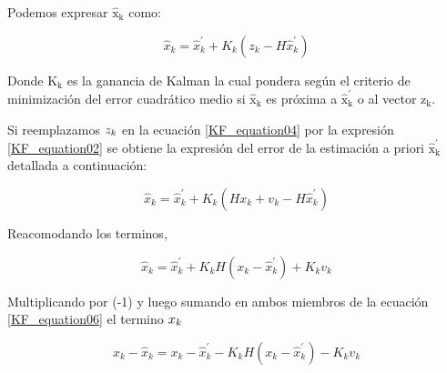 \documentclass[10pt,a4paper]{article}
\begin{document}
    \noindent Podemos expresar $\mathrm{\hat{x}_k}$ como: 
	
	\begin{figure}[h!]
		\begin{center}
			\begin{equation}
				\hat{x}_k = \hat{x}^\prime_k + K_k (z_k - H\hat{x}^\prime_k)
				\label{KF_equation04}
			\end{equation}	
		\end{center}
	\end{figure}
	
    \noindent Donde $\mathrm{K_k}$ es la ganancia de Kalman la cual pondera 
    según el criterio de minimización del error cuadrático medio si
    $\mathrm{\hat{x}_k}$ es próxima a $\mathrm{\hat{x}^\prime_k}$ o al vector 
    $\mathrm{z_k}$.
	
    \noindent Si reemplazamos $\noindent{z_k}$ en la ecuación 
    \ref{KF_equation04} por la expresión \ref{KF_equation02} se obtiene la 
    expresión del error de la estimación a priori $\mathrm{\hat{x}^\prime_k}$ 
    detallada a continuación:
	
	\begin{figure}[h!]
		\begin{center}
			\begin{equation}
				\hat{x}_k = \hat{x}^\prime_k + K_k (Hx_{k} + v_{k} - H\hat{x}^\prime_k)
				\label{KF_equation05}
			\end{equation}	
		\end{center}
	\end{figure}

    \clearpage
	
	\noindent Reacomodando los terminos, 
	
	\begin{figure}[h!]
		\begin{center}
			\begin{equation}
				\hat{x}_k = \hat{x}^\prime_k + K_k H (x_{k}  - \hat{x}^\prime_k) + K_kv_{k}
				\label{KF_equation06}
			\end{equation}	
		\end{center}
	\end{figure}
	
	\noindent Multiplicando por (-1) y luego sumando en ambos miembros de la 
    ecuación \ref{KF_equation06} el termino $\noindent{x_k}$ 
	
	\begin{figure}[h!]
		\begin{center}
			\begin{equation}
				x_k - \hat{x}_k = x_{k} -\hat{x}^\prime_k - K_k H (x_{k}  - \hat{x}^\prime_k) - K_kv_{k}
				\label{KF_equation08}
			\end{equation}	
		\end{center}
	\end{figure}
	
\end{document}
